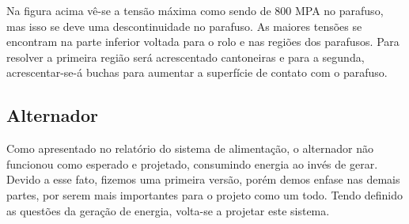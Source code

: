     Na figura acima vê-se a tensão máxima como sendo de 800 MPA no parafuso, mas isso se deve uma descontinuidade no parafuso. As maiores tensões se encontram na parte inferior voltada para o rolo e nas regiões dos parafusos. Para resolver a primeira região será acrescentado cantoneiras e para a segunda, acrescentar-se-á buchas para aumentar a superfície de contato com o parafuso.

\subsection{Alternador}
    Como apresentado no relatório do sistema de alimentação, o alternador não funcionou como esperado e projetado, consumindo energia ao invés de gerar. Devido a esse fato, fizemos uma primeira versão, porém demos enfase nas demais partes, por serem mais importantes para o projeto como um todo. Tendo definido as questões da geração de energia, volta-se a projetar este sistema.
